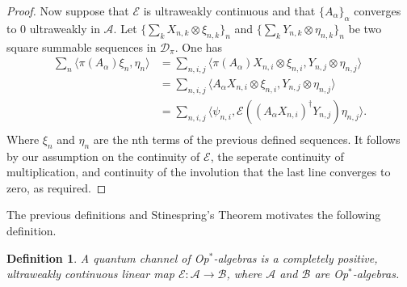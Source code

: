 \documentclass[12pt]{article}
\newtheorem*{definition}{Definition}
\newcommand\mc{\mathcal}
\newcommand\ms{\mathscr}
\newcommand{\ip}[2]{\langle #1, #2 \rangle}
\begin{document}
\begin{proof}
	Now suppose that $\mc{E}$ is ultraweakly continuous and that $\{A_\alpha\}_\alpha$ converges to $0$ ultraweakly in $\ms{A}$.
	Let $\{\sum_k X_{n,k} \otimes \xi_{n, k}\}_n$ and $\{\sum_k Y_{n, k} \otimes \eta_{n, k}\}_n$
	be two square summable sequences in $\mc{D}_\pi$. One has
	\begin{align*}
	   	\sum_n \ip{\pi(A_\alpha)\xi_n}{\eta_n} 
		&= \sum_{n, i, j} \ip{\pi(A_\alpha)X_{n, i} \otimes \xi_{n, i}}{Y_{n, j} \otimes \eta_{n, j}} \\
		&= \sum_{n, i, j} \ip{A_\alpha X_{n,i} \otimes \xi_{n, i}}{Y_{n,j} \otimes \eta_{n,j}} \\
		&= \sum_{n, i, j} \ip{\psi_{n, i}}{\mc{E}((A_\alpha X_{n,i})^\dagger Y_{n,j})\eta_{n, j}}. \\ 
	\end{align*}
	Where $\xi_n$ and $\eta_n$ are the nth terms of the previous defined sequences.	
	It follows by our assumption on the continuity of $\mc{E}$, the seperate continuity of multiplication, and continuity 
	of the involution that the last line converges to zero, as required.
\end{proof}

The previous definitions and Stinespring's Theorem motivates the following definition.

\begin{definition}
	A quantum channel of Op$^*$-algebras is a completely positive, ultraweakly continuous linear map $\mc{E}:\ms{A} \to \ms{B}$, 
	where $\ms{A}$ and $\ms{B}$ are Op$^*$-algebras.
\end{definition}
\end{document}
